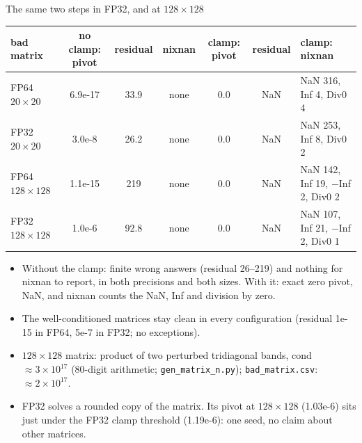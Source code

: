 \documentclass[aspectratio=169,10pt,xcolor=table]{beamer}
\begin{document}
\begin{frame}{The same two steps in FP32, and at $128{\times}128$}
\centering\scriptsize
\begin{tabular}{lcccccl}
\toprule
bad matrix & no clamp: pivot & residual & nixnan & clamp: pivot & residual & clamp: nixnan\\
\midrule
FP64 $20{\times}20$ & 6.9e-17 & \cellcolor{red!12}33.9 & \cellcolor{red!12}none & 0.0 & \cellcolor{red!12}NaN & NaN 316, Inf 4, Div0 4\\
FP32 $20{\times}20$ & 3.0e-8 & \cellcolor{red!12}26.2 & \cellcolor{red!12}none & 0.0 & \cellcolor{red!12}NaN & NaN 253, Inf 8, Div0 2\\
FP64 $128{\times}128$ & 1.1e-15 & \cellcolor{red!12}219 & \cellcolor{red!12}none & 0.0 & \cellcolor{red!12}NaN & NaN 142, Inf 19, $-$Inf 2, Div0 2\\
FP32 $128{\times}128$ & 1.0e-6 & \cellcolor{red!12}92.8 & \cellcolor{red!12}none & 0.0 & \cellcolor{red!12}NaN & NaN 107, Inf 21, $-$Inf 2, Div0 1\\
\bottomrule
\end{tabular}

\vspace{3mm}\raggedright\footnotesize
\begin{itemize}
\item Without the clamp: finite wrong answers (residual 26--219) and nothing for nixnan to report, in both precisions and both sizes. With it: exact zero pivot, NaN, and nixnan counts the NaN, Inf and division by zero.
\item The well-conditioned matrices stay clean in every configuration (residual 1e-15 in FP64, 5e-7 in FP32; no exceptions).
\item $128{\times}128$ matrix: product of two perturbed tridiagonal bands, cond $\approx 3\times10^{17}$ (80-digit arithmetic; \texttt{gen\_matrix\_n.py}); \texttt{bad\_matrix.csv}: $\approx 2\times10^{17}$.
\item FP32 solves a rounded copy of the matrix. Its pivot at $128{\times}128$ (1.03e-6) sits just under the FP32 clamp threshold (1.19e-6): one seed, no claim about other matrices.
\end{itemize}
\end{frame}
\end{document}
